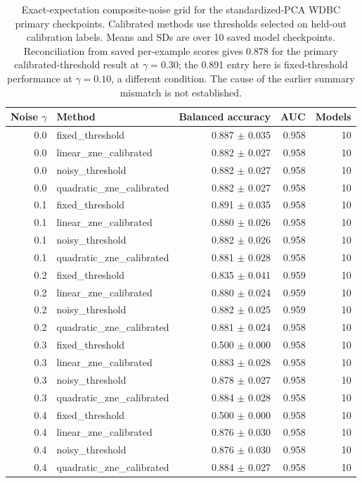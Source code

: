 \documentclass[10pt]{article}
\begin{document}
\begin{table}[t]\centering\scriptsize
\caption{Exact-expectation composite-noise grid for the standardized-PCA WDBC primary checkpoints. Calibrated methods use thresholds selected on held-out calibration labels. Means and SDs are over 10 saved model checkpoints. Reconciliation from saved per-example scores gives 0.878 for the primary calibrated-threshold result at $\gamma=0.30$; the 0.891 entry here is fixed-threshold performance at $\gamma=0.10$, a different condition. The cause of the earlier summary mismatch is not established.}
\label{tab:stdnoise}
\begin{tabular}{@{}r l r r r@{}}\toprule
Noise $\gamma$ & Method & Balanced accuracy & AUC & Models \\ \midrule
0.0 & fixed\_threshold & 0.887 $\pm$ 0.035 & 0.958 & 10 \\
0.0 & linear\_zne\_calibrated & 0.882 $\pm$ 0.027 & 0.958 & 10 \\
0.0 & noisy\_threshold & 0.882 $\pm$ 0.027 & 0.958 & 10 \\
0.0 & quadratic\_zne\_calibrated & 0.882 $\pm$ 0.027 & 0.958 & 10 \\
0.1 & fixed\_threshold & 0.891 $\pm$ 0.035 & 0.958 & 10 \\
0.1 & linear\_zne\_calibrated & 0.880 $\pm$ 0.026 & 0.958 & 10 \\
0.1 & noisy\_threshold & 0.882 $\pm$ 0.026 & 0.958 & 10 \\
0.1 & quadratic\_zne\_calibrated & 0.881 $\pm$ 0.028 & 0.958 & 10 \\
0.2 & fixed\_threshold & 0.835 $\pm$ 0.041 & 0.959 & 10 \\
0.2 & linear\_zne\_calibrated & 0.880 $\pm$ 0.024 & 0.959 & 10 \\
0.2 & noisy\_threshold & 0.882 $\pm$ 0.025 & 0.959 & 10 \\
0.2 & quadratic\_zne\_calibrated & 0.881 $\pm$ 0.024 & 0.958 & 10 \\
0.3 & fixed\_threshold & 0.500 $\pm$ 0.000 & 0.958 & 10 \\
0.3 & linear\_zne\_calibrated & 0.883 $\pm$ 0.028 & 0.958 & 10 \\
0.3 & noisy\_threshold & 0.878 $\pm$ 0.027 & 0.958 & 10 \\
0.3 & quadratic\_zne\_calibrated & 0.884 $\pm$ 0.028 & 0.958 & 10 \\
0.4 & fixed\_threshold & 0.500 $\pm$ 0.000 & 0.958 & 10 \\
0.4 & linear\_zne\_calibrated & 0.876 $\pm$ 0.030 & 0.958 & 10 \\
0.4 & noisy\_threshold & 0.876 $\pm$ 0.030 & 0.958 & 10 \\
0.4 & quadratic\_zne\_calibrated & 0.884 $\pm$ 0.027 & 0.958 & 10 \\
\bottomrule\end{tabular}\end{table}
\end{document}
